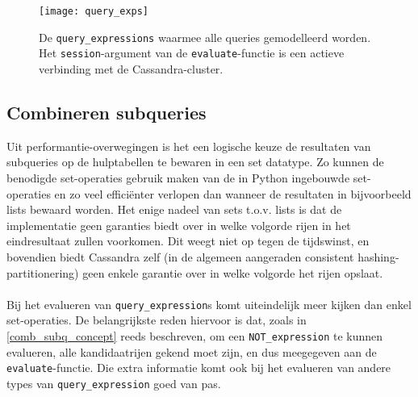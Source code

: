 \begin{figure}[h]
\texttt{[image: query\_exps]}
\caption{De \texttt{query\_expressions} waarmee alle queries gemodelleerd worden. Het \texttt{session}-argument van de \texttt{evaluate}-functie is een actieve verbinding met de Cassandra-cluster.}
\label{query_exps_diagram}
\end{figure}

\subsection{Combineren subqueries}

Uit performantie-overwegingen is het een logische keuze de resultaten van subqueries op de hulptabellen te bewaren in een set datatype. Zo kunnen de benodigde set-operaties gebruik maken van de in Python ingebouwde set-operaties en zo veel effici\"enter verlopen dan wanneer de resultaten in bijvoorbeeld lists bewaard worden. Het enige nadeel van sets t.o.v. lists is dat de implementatie geen garanties biedt over in welke volgorde rijen in het eindresultaat zullen voorkomen. Dit weegt niet op tegen de tijdswinst, en bovendien biedt Cassandra zelf (in de algemeen aangeraden consistent hashing-partitionering) geen enkele garantie over in welke volgorde het rijen opslaat.\\\\
Bij het evalueren van \texttt{query\_expression}s komt uiteindelijk meer kijken dan enkel set-operaties. De belangrijkste reden hiervoor is dat, zoals in \ref{comb_subq_concept} reeds beschreven, om een \texttt{NOT\_expression} te kunnen evalueren, alle kandidaatrijen gekend moet zijn, en dus meegegeven aan de \texttt{evaluate}-functie. Die extra informatie komt ook bij het evalueren van andere types van \texttt{query\_expression} goed van pas.
 

